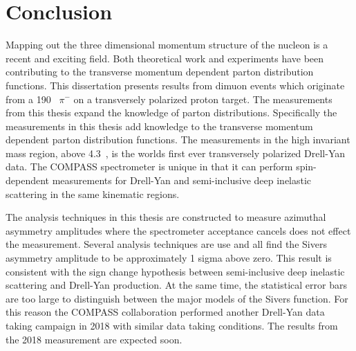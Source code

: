 \chapter{Conclusion}
\label{ch::conclusion}

Mapping out the three dimensional momentum structure of the nucleon is a recent
and exciting field.  Both theoretical work and experiments have been
contributing to the transverse momentum dependent parton distribution functions.
This dissertation presents results from dimuon events which originate from a
190~{\gvc} $\pi^-$ on a transversely polarized proton target.  The measurements
from this thesis expand the knowledge of parton distributions.  Specifically the
measurements in this thesis add knowledge to the transverse momentum dependent
parton distribution functions.  The measurements in the high invariant mass
region, above 4.3~{\gvcw}, is the worlds first ever transversely polarized
Drell-Yan data.  The COMPASS spectrometer is unique in that it can perform
spin-dependent measurements for Drell-Yan and semi-inclusive deep inelastic
scattering in the same kinematic regions.

The analysis techniques in this thesis are constructed to measure azimuthal
asymmetry amplitudes where the spectrometer acceptance cancels does not effect
the measurement.  Several analysis techniques are use and all find the Sivers
asymmetry amplitude to be approximately 1 sigma above zero.  This result is
consistent with the sign change hypothesis between semi-inclusive deep inelastic
scattering and Drell-Yan production.  At the same time, the statistical error
bars are too large to distinguish between the major models of the Sivers
function.  For this reason the COMPASS collaboration performed another Drell-Yan
data taking campaign in 2018 with similar data taking conditions.  The results
from the 2018 measurement are expected soon.
